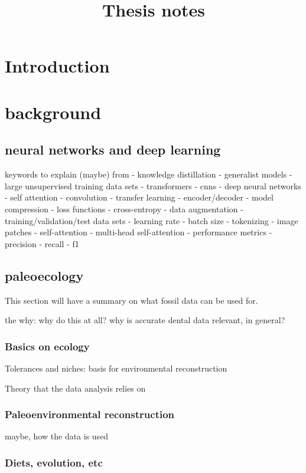 \documentclass{article}
\title{Thesis notes}
\begin{document}
\tableofcontents

\section{Introduction}

\section{background}

\subsection{neural networks and deep learning}
keywords to explain (maybe) from \cite{li2021trocr}
- knowledge distillation
- generalist models
	- large unsupervised training data sets
- transformers
- cnns
- deep neural networks
- self attention
- convolution
- transfer learning
- encoder/decoder
- model compression
- loss functions
	- cross-entropy 
- data augmentation
- training/validation/test data sets
- learning rate
- batch size
- tokenizing
- image patches
- self-attention
- multi-head self-attention
- performance metrics
	- precision
	- recall 
	- f1

\subsection{paleoecology}

This section will have a summary on what fossil data can be used for.

the why: why do this at all? why is accurate dental data relevant, in general?

\subsubsection{Basics on ecology}

Tolerances and niches: basis for environmental reconstruction \cite{Faith_Lyman_2019}

Theory that the data analysis relies on

\subsubsection{Paleoenvironmental reconstruction}

maybe, how the data is used

\subsubsection{Diets, evolution, etc}
\end{document}
